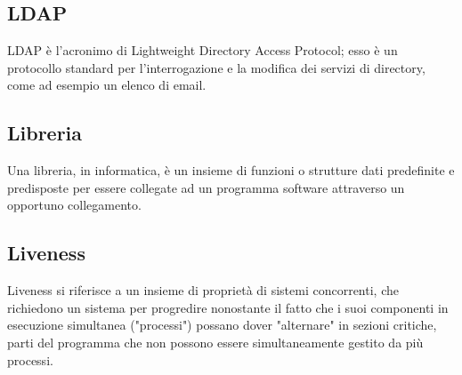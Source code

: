 
\subsection*{LDAP}
LDAP è l'acronimo di Lightweight Directory Access Protocol; esso è un protocollo standard per l'interrogazione e la modifica dei servizi di directory, come ad esempio un elenco di email.

\subsection*{Libreria}
Una libreria, in informatica, è un insieme di funzioni o strutture dati predefinite e predisposte per essere collegate ad un programma software attraverso un opportuno collegamento.

\subsection*{Liveness}
Liveness si riferisce a un insieme di proprietà di sistemi concorrenti, che richiedono un sistema per progredire nonostante il fatto che i suoi componenti in esecuzione simultanea ("processi") possano dover "alternare" in sezioni critiche, parti del programma che non possono essere simultaneamente gestito da più processi.

